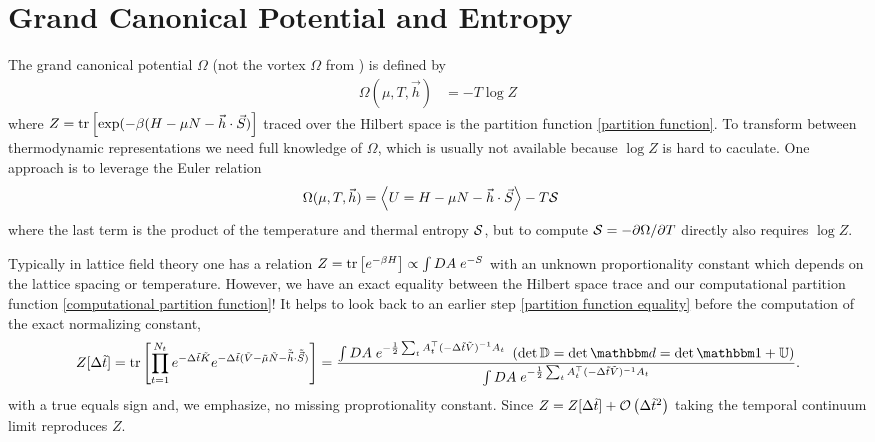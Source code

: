 
\section{Grand Canonical Potential and Entropy}\label{sec:entropy}

The grand canonical potential $\Omega$ (not the vortex $\Omega$ from ) is defined by
\begin{align}
	\Omega(\mu, T, \vec{h}) &= - T \log Z
\end{align}
where $Z = \text{tr}\left[\exp(-\beta(H-\mu N - \vec{h}\cdot\vec{S})\right]$ traced over the Hilbert space is the partition function \eqref{partition function}.
To transform between thermodynamic representations we need full knowledge of $\Omega$, which is usually not available because $\log Z$ is hard to caculate.
One approach is to leverage the Euler relation
\begin{align}
	\Omega(\mu, T, \vec{h})
	&=
	\left\langle U = H - \mu N - \vec{h}\cdot\vec{S} \right\rangle - T\mathcal{S}
\end{align}
where the last term is the product of the temperature and thermal entropy $\mathcal{S}$, but to compute $\mathcal{S} = -\partial \Omega / \partial T$ directly also requires $\log Z$.

Typically in lattice field theory one has a relation $Z = \text{tr}\left[e^{-\beta H}\right] \propto \int DA\; e^{-S}$ with an unknown proportionality constant which depends on the lattice spacing or temperature.
However, we have an exact equality between the Hilbert space trace and our computational partition function \eqref{computational partition function}!
It helps to look back to an earlier step \eqref{partition function equality} before the computation of the exact normalizing constant,
\begin{align}
	Z[\Delta\tilde{t}]=\tr{\prod_{t=1}^{N_t} e^{-\Delta \tilde{t}\tilde{K}}  e^{-\Delta \tilde{t}(\tilde{V} - \tilde{\mu}\tilde{N} - \tilde{\vec{h}}\cdot\tilde{\vec{S}})} }
	= 
	\frac{  
		\int DA\; e^{-\frac{1}{2} \sum_t A\transpose_t (-\Delta\tilde{t} \tilde{V})\inverse A_t}
	~	\left(\det \DD = \det \dd = \det \one + \UU \right)
	}{ 
		\int DA\; e^{-\frac{1}{2} \sum_t A\transpose_t (-\Delta\tilde{t} \tilde{V})\inverse A_t}
	}.
	\label{eq:true Z}
\end{align}
with a true equals sign and, we emphasize, no missing proprotionality constant.
Since $Z = Z[\Delta \tilde{t}] + \mathcal{O}\left(\Delta \tilde{t}^2\right)$ taking the temporal continuum limit reproduces $Z$.

